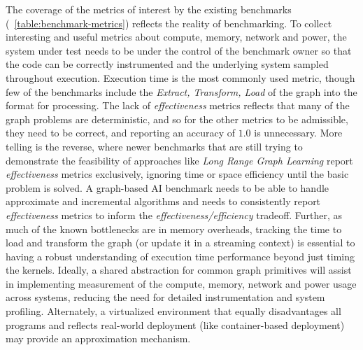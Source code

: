%
%
The coverage of the metrics of interest by the existing benchmarks (~\ref{table:benchmark-metrics}) reflects the reality of benchmarking.
To collect interesting and useful metrics about compute, memory, network and power, the system under test needs to be under the control of the benchmark owner so that the code can be correctly instrumented and the underlying system sampled throughout execution. 
Execution time is the most commonly used metric, though few of the benchmarks include the \textit{Extract, Transform, Load} of the graph into the format for processing. 
The lack of \textit{effectiveness} metrics reflects that many of the graph problems are deterministic, and so for the other metrics to be admissible, they need to be correct, and reporting an accuracy of $1.0$ is unnecessary. 
More telling is the reverse, where newer benchmarks that are still trying to demonstrate the feasibility of approaches like \textit{Long Range Graph Learning} report \textit{effectiveness} metrics exclusively, ignoring time or space efficiency until the basic problem is solved. 
A graph-based AI benchmark needs to be able to handle approximate and incremental algorithms and needs to consistently report \textit{effectiveness} metrics to inform the \textit{effectiveness/efficiency} tradeoff.
Further, as much of the known bottlenecks are in memory overheads, tracking the time to load and transform the graph (or update it in a streaming context) is essential to having a robust understanding of execution time performance beyond just timing the kernels. 
Ideally, a shared abstraction for common graph primitives will assist in implementing measurement of the compute, memory, network and power usage across systems, reducing the need for detailed instrumentation and system profiling. 
Alternately, a virtualized environment that equally disadvantages all programs and reflects real-world deployment (like container-based deployment) may provide an approximation mechanism.

